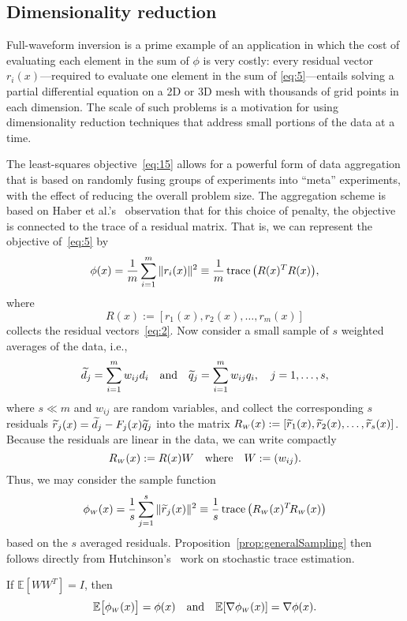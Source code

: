 \documentclass[nospthms]{svjour3}
\numberwithin{equation}{section}
\def\norm#1{\|#1\|}
\def\trace{\mathop{\hbox{\rm trace}}}
\def\text #1{\hbox{\quad#1\quad}}
\def\T{^T\!}
\def\W{_{\scriptscriptstyle W}}
\def\dtilde{\widetilde d}
\def\qtilde{\widetilde q}
\def\rtilde{\skew3\widetilde r}
\def\expval{\mathbb{E}}
\begin{document}
\subsection{Dimensionality reduction} \label{sec:dr}

Full-waveform inversion is a prime example of an application in which
the cost of evaluating each element in the sum of $\phi$ is very
costly: every residual vector $r_i(x)$---required to evaluate one
element in the sum of \eqref{eq:5}---entails solving a partial
differential equation on a 2D or 3D mesh with thousands of grid points
in each dimension.  The scale of such problems is a motivation for
using dimensionality reduction techniques that address small portions
of the data at a time.

The least-squares objective~\eqref{eq:15} allows for a powerful form
of data aggregation that is based on randomly fusing groups of
experiments into ``meta'' experiments, with the effect of
reducing the overall problem size. The aggregation scheme is based on Haber et
al.'s~\cite{haber10} observation that for this choice of penalty, the
objective is connected to the trace of a residual matrix. That is, we can
represent the objective of~\eqref{eq:5} by
\begin{equation}\label{eq:17}
  \phi(x) = \frac1m\sum_{i=1}^m\norm{r_i(x)}^2
            \equiv \frac{1}{m}\trace\big(R(x)^T R(x)\big)\\,
\end{equation}
where
\[
  R(x) := [r_1(x), r_2(x), \ldots, r_m(x) ]
\]
collects the residual vectors~\eqref{eq:2}. Now consider a small
sample of $s$ weighted averages of the data, i.e.,
\[
 \dtilde_j = \sum_{i=1}^m w_{ij} d_i
 \text{and}
 \qtilde_j = \sum_{i=1}^m w_{ij} q_i,
 \quad
 j = 1,\ldots,s,
\]
where $s\ll m$ and $w_{ij}$ are random variables, and collect the
corresponding $s$ residuals $\rtilde_j(x)=\dtilde_j - F_j(x)\qtilde_j$
into the matrix $R\W(x) := [\rtilde_1(x), \rtilde_2(x), \ldots,
\rtilde_s(x) ]$. Because the residuals are linear in the data, we can
write compactly
\[
 R\W(x) := R(x)W
 \text{where}
 W := (w_{ij}).
\]
Thus, we may consider the sample function
\begin{equation} \label{eq:3}
  \phi\W(x) = \frac1s\sum_{j=1}^s\norm{\rtilde_j(x)}^2
            \equiv \frac{1}{s}\trace\big( R\W(x)\T R\W(x) \big)
\end{equation}
based on the $s$ averaged residuals.
Proposition~\ref{prop:generalSampling} then follows directly from
Hutchinson's~\cite[\S2]{Hutchinson:1990} work on stochastic trace
estimation.
\begin{bproposition}
\label{prop:generalSampling}
If $\expval[WW^T] = I$, then
\begin{equation*}
 \expval\big[\phi\W(x)\big] = \phi(x)
 \text{and}
 \expval[\nabla\phi\W(x)] = \nabla\phi(x).
\end{equation*}
\end{bproposition}
\end{document}

